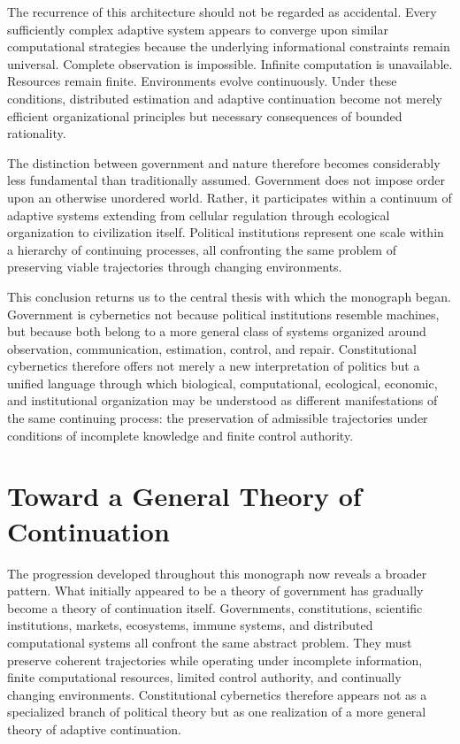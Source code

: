 \documentclass[12pt,a4paper]{article}
\begin{document}
The recurrence of this architecture should not be regarded as accidental. Every sufficiently complex adaptive system appears to converge upon similar computational strategies because the underlying informational constraints remain universal. Complete observation is impossible. Infinite computation is unavailable. Resources remain finite. Environments evolve continuously. Under these conditions, distributed estimation and adaptive continuation become not merely efficient organizational principles but necessary consequences of bounded rationality.

The distinction between government and nature therefore becomes considerably less fundamental than traditionally assumed. Government does not impose order upon an otherwise unordered world. Rather, it participates within a continuum of adaptive systems extending from cellular regulation through ecological organization to civilization itself. Political institutions represent one scale within a hierarchy of continuing processes, all confronting the same problem of preserving viable trajectories through changing environments.

This conclusion returns us to the central thesis with which the monograph began. Government is cybernetics not because political institutions resemble machines, but because both belong to a more general class of systems organized around observation, communication, estimation, control, and repair. Constitutional cybernetics therefore offers not merely a new interpretation of politics but a unified language through which biological, computational, ecological, economic, and institutional organization may be understood as different manifestations of the same continuing process: the preservation of admissible trajectories under conditions of incomplete knowledge and finite control authority.

\section{Toward a General Theory of Continuation}

The progression developed throughout this monograph now reveals a broader pattern. What initially appeared to be a theory of government has gradually become a theory of continuation itself. Governments, constitutions, scientific institutions, markets, ecosystems, immune systems, and distributed computational systems all confront the same abstract problem. They must preserve coherent trajectories while operating under incomplete information, finite computational resources, limited control authority, and continually changing environments. Constitutional cybernetics therefore appears not as a specialized branch of political theory but as one realization of a more general theory of adaptive continuation.
\end{document}
